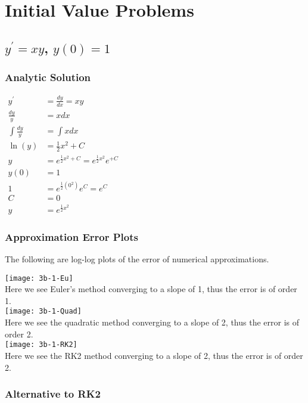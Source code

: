 \documentclass[12pt]{article}
\begin{document}
	\section{Initial Value Problems}
	\subsection{$y^{\prime}=xy$, $y(0)=1$ }
	\subsubsection{Analytic Solution}
	$
	\begin{aligned}
	y^{\prime}
	&=\frac{dy}{dx}=xy
	\\	
	\frac{dy}{y}
	&=xdx
	\\
	\int\frac{dy}{y}
	&=\int xdx
	\\
	\ln(y)
	&=\frac{1}{2}x^{2}+C
	\\
	y
	&=e^{\frac{1}{2}x^{2}+C}=e^{\frac{1}{2}x^{2}}e^{+C}
	\\
	y(0)
	&=1
	\\
	1
	&=e^{\frac{1}{2}(0^{2})}e^{C}=e^{C}
	\\
	C
	&=0
	\\
	y
	&=e^{\frac{1}{2}x^{2}}
	\end{aligned}
	$
	
	\subsubsection{Approximation Error Plots}
	
	The following are log-log plots of the error of numerical approximations. 
	
	\texttt{[image: 3b-1-Eu]}
	\\
	Here we see Euler's method converging to a slope of 1, thus the error is of order 1.
	\\
	\texttt{[image: 3b-1-Quad]}
	\\
	Here we see the quadratic method converging to a slope of 2, thus the error is of order 2.
	\\
	\texttt{[image: 3b-1-RK2]}
	\\
	Here we see the RK2 method converging to a slope of 2, thus the error is of order 2.
	
	\clearpage
	
	\subsubsection{Alternative to RK2}
	
\end{document}
